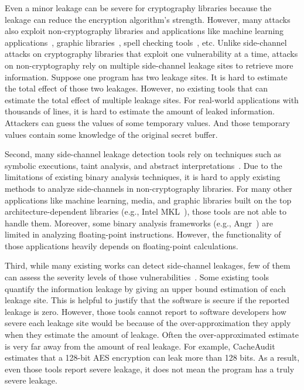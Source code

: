 Even a minor leakage can be severe for cryptography libraries because
the leakage can reduce the encryption algorithm's strength. However,
many attacks also exploit non-cryptography libraries and applications
like machine learning
applications~\cite{yan2020cache,hong2018security}, graphic
libraries~\cite{wang2019unveiling}, spell checking
tools~\cite{xu2015controlled}, etc. Unlike side-channel attacks on
cryptography libraries that exploit one vulnerability at a time,
attacks on non-cryptography rely on multiple side-channel leakage
sites to retrieve more information. Suppose one program has two
leakage sites. It is hard to estimate the total effect of those two
leakages. However, no existing tools that can estimate the total
effect of multiple leakage sites. For real-world applications with
thousands of lines, it is hard to estimate the amount of leaked
information. Attackers can guess the values of some temporary
values. And those temporary values contain some knowledge of the
original secret buffer.

Second, many side-channel leakage detection tools rely on
techniques such as symbolic executions, taint analysis, and abstract interpretations~\cite{203878,182946,Brotzman19Casym,236338}. Due
to the limitations of existing binary analysis techniques, it is hard to apply existing methods to analyze side-channels in non-cryptography
libraries. For many other applications like machine learning, media,
and graphic libraries built on the top architecture-dependent
libraries (e.g., Intel MKL~\cite{wang2014intel}), those tools are not able to
handle them. Moreover, some binary analysis frameworks (e.g.,
Angr~\cite{shoshitaishvili2016state}) are limited in analyzing
floating-point instructions. However, the functionality of those
applications heavily depends on floating-point calculations.

Third, while many existing works can detect side-channel leakages, few
of them can assess the severity levels of those
vulnerabilities~\cite{182946,203878,182946,236338,217537,langley2010ctgrind,xiao2017stacco,wang2019time,Wichelmann:2018:MFF:3274694.3274741,bao2021abacus,236334,wang2021data,sung2018canal}.
Some existing tools~\cite{182946,chattopadhyay2019quantifying, biondi2018scalable,5207642,pasareanu2016multi,AskarovC12,phan2017synthesis} quantify the information leakage by giving an upper
bound estimation of each leakage site.  This is helpful to justify that the software is secure if the reported leakage is zero. However,
those tools cannot report to software developers how severe each leakage site would be because of the over-approximation they apply when they estimate the amount of leakage.  Often the over-approximated estimate is very far away from the amount of real leakage.
For example, CacheAudit~\cite{182946} estimates that a 128-bit
AES encryption can leak more than 128 bits. As a result, even those
tools report severe leakage, it does not mean the program has a truly severe leakage. 

